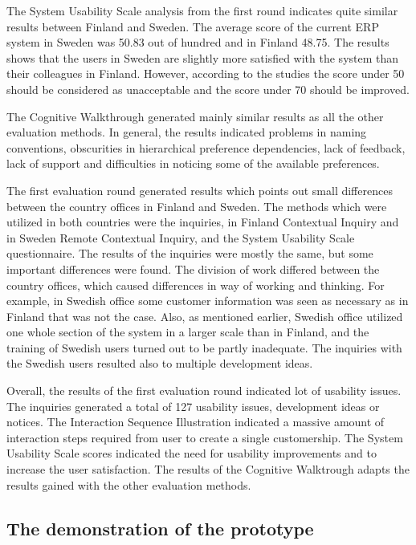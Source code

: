 \documentclass[12pt,a4paper,oneside,pdftex]{report}
\begin{document}
The System Usability Scale analysis from the first round indicates quite similar results between Finland and Sweden. The average score of the current ERP system in Sweden was 50.83 out of hundred and in Finland 48.75. The results shows that the users in Sweden are slightly more satisfied with the system than their colleagues in Finland. However, according to the studies \cite{RefWorks:12} the score under 50 should be considered as unacceptable and the score under 70 should be improved. 

The Cognitive Walkthrough generated mainly similar results as all the other evaluation methods. In general, the results indicated problems in naming conventions, obscurities in hierarchical preference dependencies, lack of feedback, lack of support and difficulties in noticing some of the available preferences. 

The first evaluation round generated results which points out small differences between the country offices in Finland and Sweden. The methods which were utilized in both countries were the inquiries, in Finland Contextual Inquiry and in Sweden Remote Contextual Inquiry, and the System Usability Scale questionnaire. The results of the inquiries were mostly the same, but some important differences were found. The division of work differed between the country offices, which caused differences in way of working and thinking. For example, in Swedish office some customer information was seen as necessary as in Finland that was not the case. Also, as mentioned earlier, Swedish office utilized one whole section of the system in a larger scale than in Finland, and the training of Swedish users turned out to be partly inadequate. The inquiries with the Swedish users resulted also to multiple development ideas. 

Overall, the results of the first evaluation round indicated lot of usability issues. The inquiries generated a total of 127 usability issues, development ideas or notices. The Interaction Sequence Illustration indicated a massive amount of interaction steps required from user to create a single customership. The System Usability Scale scores indicated the need for usability improvements and to increase the user satisfaction. The results of the Cognitive Walktrough adapts the results gained with the other evaluation methods. 




\subsection{The demonstration of the prototype}
\label{sec:demoproto}
\end{document}
